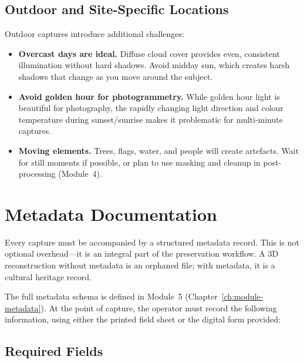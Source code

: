 \subsection{Outdoor and Site-Specific Locations}

Outdoor captures introduce additional challenges:

\begin{itemize}
  \item \textbf{Overcast days are ideal.} Diffuse cloud cover provides even, consistent illumination without hard shadows. Avoid midday sun, which creates harsh shadows that change as you move around the subject.
  \item \textbf{Avoid golden hour for photogrammetry.} While golden hour light is beautiful for photography, the rapidly changing light direction and colour temperature during sunset/sunrise makes it problematic for multi-minute captures.
  \item \textbf{Moving elements.} Trees, flags, water, and people will create artefacts. Wait for still moments if possible, or plan to use masking and cleanup in post-processing (Module~4).
\end{itemize}

\section{Metadata Documentation}
\label{sec:cap-metadata}

Every capture must be accompanied by a structured metadata record. This is not optional overhead---it is an integral part of the preservation workflow. A 3D reconstruction without metadata is an orphaned file; with metadata, it is a cultural heritage record.

The full metadata schema is defined in Module~5 (Chapter~\ref{ch:module-metadata}). At the point of capture, the operator must record the following information, using either the printed field sheet or the digital form provided:

\subsection{Required Fields}

